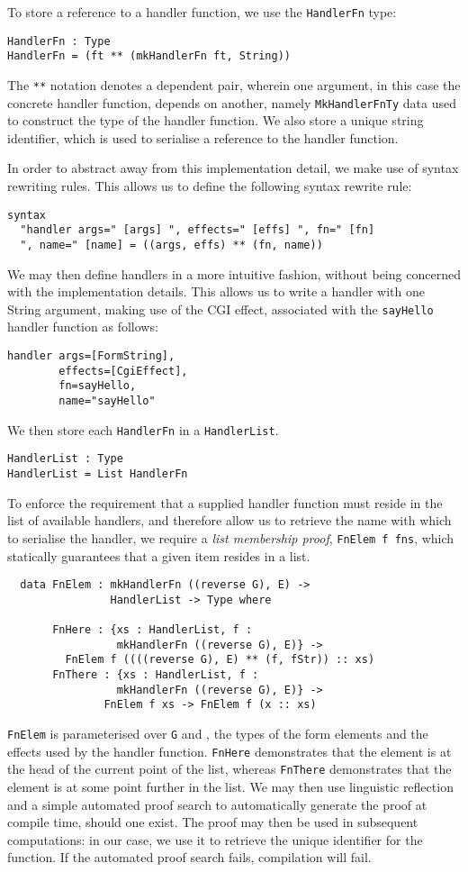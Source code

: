 To store a reference to a handler function, we use the \texttt{HandlerFn} type:
\begin{Verbatim}
HandlerFn : Type
HandlerFn = (ft ** (mkHandlerFn ft, String))
\end{Verbatim}
%
The \texttt{**} notation denotes a dependent pair, wherein one argument, in this case the concrete handler function, depends on another, namely \texttt{MkHandlerFnTy} data used to construct the type of the handler function. We also store a unique string identifier, which is used to serialise a reference to the handler function. 

In order to abstract away from this implementation detail, we make use of \idris{} syntax rewriting rules. This allows us to define the following syntax rewrite rule:
\begin{Verbatim}
syntax 
  "handler args=" [args] ", effects=" [effs] ", fn=" [fn] 
  ", name=" [name] = ((args, effs) ** (fn, name))
\end{Verbatim}
We may then define handlers in a more intuitive fashion, without being concerned with the implementation details. This allows us to write a handler with one String argument, making use of the CGI effect, associated with the \texttt{sayHello} handler function as follows:
\begin{Verbatim}
handler args=[FormString], 
        effects=[CgiEffect], 
        fn=sayHello, 
        name="sayHello"
\end{Verbatim}


We then store each \texttt{HandlerFn} in a \texttt{HandlerList}.
\begin{Verbatim}
HandlerList : Type
HandlerList = List HandlerFn
\end{Verbatim}
To enforce the requirement that a supplied handler function must reside in the list of available handlers, and therefore allow us to retrieve the name with which to serialise the handler, we require a \textit{list membership proof},  \texttt{FnElem f fns}, which statically guarantees that a given item resides in a list.
\begin{Verbatim}
  data FnElem : mkHandlerFn ((reverse G), E) -> 
                HandlerList -> Type where
                
       FnHere : {xs : HandlerList, f : 
                 mkHandlerFn ((reverse G), E)} ->
         FnElem f ((((reverse G), E) ** (f, fStr)) :: xs)
       FnThere : {xs : HandlerList, f : 
                 mkHandlerFn ((reverse G), E)} ->
               FnElem f xs -> FnElem f (x :: xs)
\end{Verbatim}
\texttt{FnElem} is parameterised over \texttt{G} and , the types of the form elements and the effects used by the handler function. \texttt{FnHere} demonstrates that the element is at the head of the current point of the list, whereas \texttt{FnThere} demonstrates that the element is at some point further in the list. %
We may then use linguistic reflection and a simple automated proof search to automatically generate the proof at compile time, should one exist. The proof may then be used in subsequent computations: in our case, we use it to retrieve the unique identifier for the function. If the automated proof search fails, compilation will fail.

